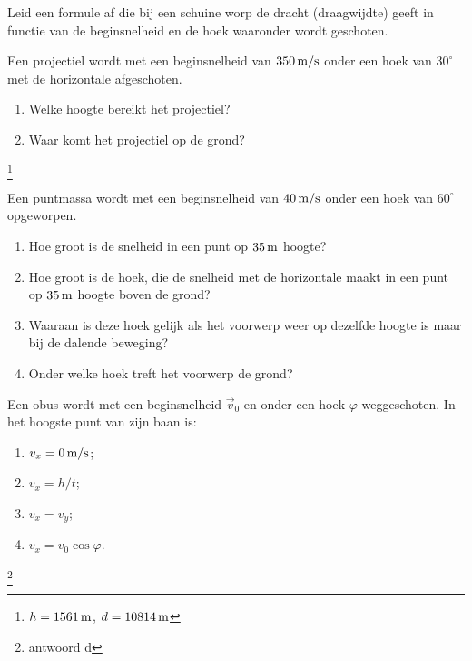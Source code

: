 \documentclass{ximera}
\begin{document}
	\author{Bart Lambregs}
    \xmsource\xmuitleg

\begin{exercise} Leid een formule af die bij een schuine worp de dracht
(draagwijdte) geeft in functie van de beginsnelheid en de hoek
waaronder wordt geschoten.

\end{exercise}

\begin{exercise} Een projectiel wordt met een beginsnelheid van $350\rm\,m/s$
onder een hoek van $30^\circ$ met de horizontale afgeschoten.
\begin{enumerate}
\item Welke hoogte bereikt het projectiel?
\item Waar komt het projectiel op de grond?
\end{enumerate}
\footnote{$h=1561\rm\,m$, $d=10814\rm\,m$}

\end{exercise}

\begin{exercise} Een puntmassa wordt met een beginsnelheid van $40\rm\,m/s$
onder een hoek van $60^{\circ}$ opgeworpen.
\begin{enumerate}
\item Hoe groot is de snelheid in een punt op $35\rm\,m$ hoogte?
\item Hoe groot is de hoek, die de snelheid met de horizontale maakt in een punt
op $35\rm\,m$ hoogte boven de grond?
\item Waaraan is deze hoek gelijk als het voorwerp weer op dezelfde
hoogte is maar bij de dalende beweging?
\item Onder welke hoek treft het voorwerp de grond?
\end{enumerate}

\end{exercise}

\begin{exercise} Een obus wordt met een beginsnelheid $\vec{v}_0$ en onder een
hoek $\varphi$ weggeschoten. In het hoogste punt van zijn baan is:
\begin{enumerate}
\item $v_x=0\rm\,m/s$;
\item $v_x=h/t$;
\item $v_x=v_y$;
\item $v_x=v_0\cos{\varphi}$.
\end{enumerate}
\footnote{antwoord d}

\end{exercise}
\end{document}
